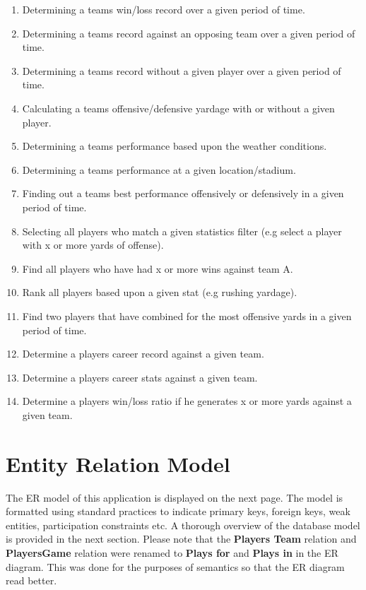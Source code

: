 \documentclass[12pt,letterpaper]{article}
\begin{document}
\begin{enumerate}
\item Determining a teams win/loss record over a given period of time.
\item Determining a teams record against an opposing team over a given period of time.
\item Determining a teams record without a given player over a given period of time.
\item Calculating a teams offensive/defensive yardage with or without a given player.
\item Determining a teams performance based upon the weather conditions.
\item Determining a teams performance at a given location/stadium.
\item Finding out a teams best performance offensively or defensively in a given period of time.
\item Selecting all players who match a given statistics filter (e.g select a player with x or more yards of offense).
\item Find all players who have had x or more wins against team A.
\item Rank all players based upon a given stat (e.g rushing yardage).
\item Find two players that have combined for the most offensive yards in a given period of time.
\item Determine a players career record against a given team.
\item Determine a players career stats against a given team.
\item Determine a players win/loss ratio if he generates x or more yards against a given team.
\end{enumerate}

\clearpage\null

\section{Entity Relation Model}
The ER model of this application is displayed on the next page. The model is formatted using standard practices to indicate primary keys, foreign keys, weak entities, participation constraints etc. A thorough overview of the database model is provided in the next section. Please note that the \textbf{Players Team} relation and \textbf{PlayersGame} relation were renamed to \textbf{Plays for} and \textbf{Plays in} in the ER diagram. This was done for the purposes of semantics so that the ER diagram read better.
\end{document}
